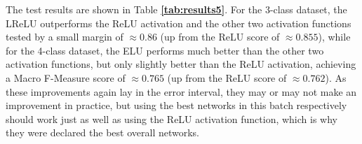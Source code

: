 The test results are shown in Table \textbf{\ref{tab:results5}}. For the 3-class dataset, the LReLU outperforms the ReLU activation and the other two activation functions tested by a small margin of $\approx0.86$ (up from the ReLU score of $\approx0.855$), while for the 4-class dataset, the ELU performs much better than the other two activation functions, but only slightly better than the ReLU activation, achieving a Macro F-Measure score of $\approx0.765$ (up from the ReLU score of $\approx0.762$). As these improvements again lay in the error interval, they may or may not make an improvement in practice, but using the best networks in this batch respectively should work just as well as using the ReLU activation function, which is why they were declared the best overall networks.\\

